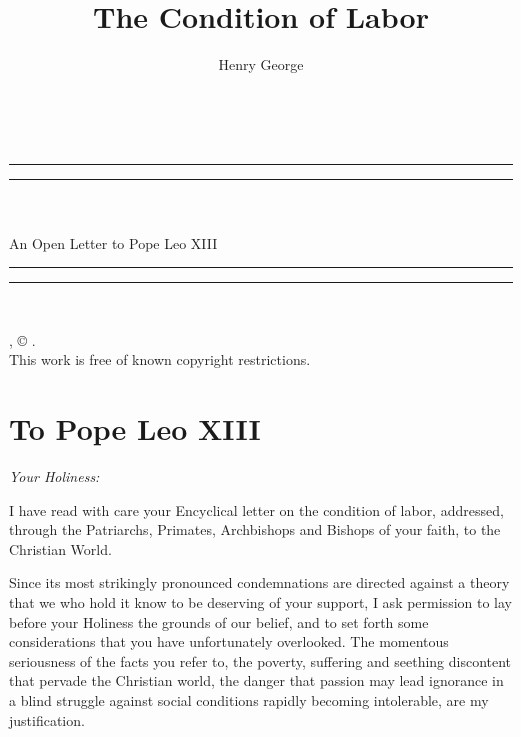 \documentclass{book}
\date{}
\title{The Condition of Labor}
\author{Henry George}
\begin{document}
\thispagestyle{empty}
\begin{center}
	{\Huge \@title   \\[5mm]}
\end{center}
\newpage
\thispagestyle{empty}
\cleardoublepage
\begin{center}
	\thispagestyle{empty}
	\vspace*{\baselineskip}
	\rule{\textwidth}{1.6pt}\vspace*{-\baselineskip}\vspace*{2pt}
	\rule{\textwidth}{0.4pt}\\[\baselineskip]
	{\Huge\scshape \@title   \\[5mm]}
	{\Large An Open Letter to Pope Leo XIII}
	\rule{\textwidth}{0.4pt}\vspace*{-\baselineskip}\vspace{3.2pt}
	\rule{\textwidth}{1.6pt}\\[\baselineskip]
	\vspace*{4\baselineskip}
	{\Large \@author}
	\vfill
\end{center}
\pagebreak
\newpage
\thispagestyle{empty}
\null\vfill
\noindent
\begin{center}
	{\emph{\@title}, © \@author.\\[5mm]}
	{This work is free of known copyright restrictions.\\[5mm]}
\end{center}
\pagebreak
\newpage
\setcounter{tocdepth}{0}
\setcounter{secnumdepth}{0}

\chapter*{To Pope Leo XIII}
\label{chapter-0}
\emph{Your Holiness:}

I have read with care your Encyclical letter on the condition of labor, addressed, through the Patriarchs, Primates, Archbishops and Bishops of your faith, to the Christian World.

Since its most strikingly pronounced condemnations are directed against a theory that we who hold it know to be deserving of your support, I ask permission to lay before your Holiness the grounds of our belief, and to set forth some considerations that you have unfortunately overlooked. The momentous seriousness of the facts you refer to, the poverty, suffering and seething discontent that pervade the Christian world, the danger that passion may lead ignorance in a blind struggle against social conditions rapidly becoming intolerable, are my justification.
\end{document}
